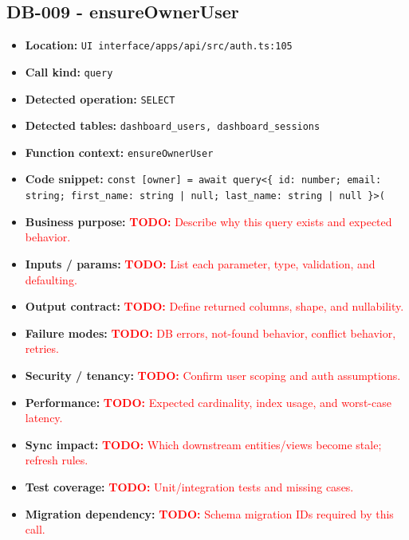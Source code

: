 \documentclass[11pt]{article}
\newcommand{\todoitem}[1]{\textcolor{red}{\textbf{TODO:} #1}}
\begin{document}
\subsection{DB-009 - ensureOwnerUser}
\begin{itemize}[leftmargin=1.5em]
\item \textbf{Location:} \texttt{UI interface/apps/api/src/auth.ts:105}
\item \textbf{Call kind:} \texttt{query}
\item \textbf{Detected operation:} \texttt{SELECT}
\item \textbf{Detected tables:} \texttt{dashboard\_users, dashboard\_sessions}
\item \textbf{Function context:} \texttt{ensureOwnerUser}
\item \textbf{Code snippet:} \texttt{const [owner] = await query<\{ id: number; email: string; first\_name: string | null; last\_name: string | null \}>(}
\item \textbf{Business purpose:} \todoitem{Describe why this query exists and expected behavior.}
\item \textbf{Inputs / params:} \todoitem{List each parameter, type, validation, and defaulting.}
\item \textbf{Output contract:} \todoitem{Define returned columns, shape, and nullability.}
\item \textbf{Failure modes:} \todoitem{DB errors, not-found behavior, conflict behavior, retries.}
\item \textbf{Security / tenancy:} \todoitem{Confirm user scoping and auth assumptions.}
\item \textbf{Performance:} \todoitem{Expected cardinality, index usage, and worst-case latency.}
\item \textbf{Sync impact:} \todoitem{Which downstream entities/views become stale; refresh rules.}
\item \textbf{Test coverage:} \todoitem{Unit/integration tests and missing cases.}
\item \textbf{Migration dependency:} \todoitem{Schema migration IDs required by this call.}
\end{itemize}
\end{document}
